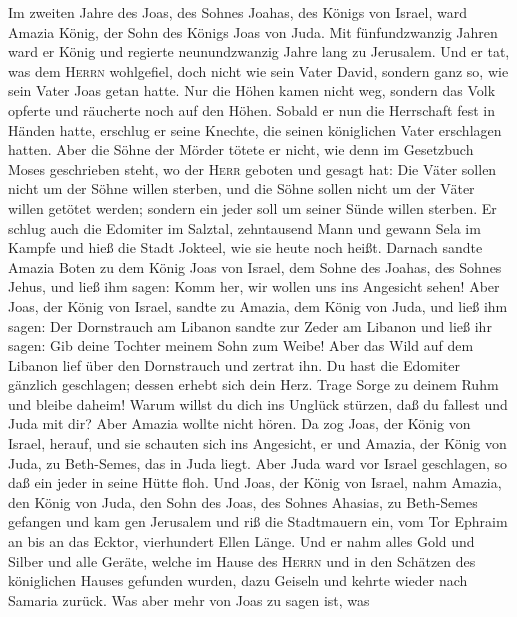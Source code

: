  Im zweiten Jahre des Joas, des Sohnes Joahas, des Königs
von Israel, ward Amazia König, der Sohn des Königs Joas von Juda.
 Mit fünfundzwanzig Jahren ward er König und regierte
neunundzwanzig Jahre lang zu Jerusalem.  Und er tat, was
dem \textsc{Herrn} wohlgefiel, doch nicht wie sein Vater David, sondern
ganz so, wie sein Vater Joas getan hatte.  Nur die Höhen
kamen nicht weg, sondern das Volk opferte und räucherte noch auf den
Höhen.  Sobald er nun die Herrschaft fest in Händen hatte,
erschlug er seine Knechte, die seinen königlichen Vater erschlagen
hatten.  Aber die Söhne der Mörder tötete er nicht, wie
denn im Gesetzbuch Moses geschrieben steht, wo der \textsc{Herr} geboten
und gesagt hat: Die Väter sollen nicht um der Söhne willen sterben, und
die Söhne sollen nicht um der Väter willen getötet werden; sondern ein
jeder soll um seiner Sünde willen sterben.  Er schlug auch
die Edomiter im Salztal, zehntausend Mann und gewann Sela im Kampfe und
hieß die Stadt Jokteel, wie sie heute noch heißt.  Darnach
sandte Amazia Boten zu dem König Joas von Israel, dem Sohne des Joahas,
des Sohnes Jehus, und ließ ihm sagen: Komm her, wir wollen uns ins
Angesicht sehen!  Aber Joas, der König von Israel, sandte
zu Amazia, dem König von Juda, und ließ ihm sagen: Der Dornstrauch am
Libanon sandte zur Zeder am Libanon und ließ ihr sagen: Gib deine
Tochter meinem Sohn zum Weibe! Aber das Wild auf dem Libanon lief über
den Dornstrauch und zertrat ihn.  Du hast die Edomiter
gänzlich geschlagen; dessen erhebt sich dein Herz. Trage Sorge zu deinem
Ruhm und bleibe daheim! Warum willst du dich ins Unglück stürzen, daß du
fallest und Juda mit dir?  Aber Amazia wollte nicht
hören. Da zog Joas, der König von Israel, herauf, und sie schauten sich
ins Angesicht, er und Amazia, der König von Juda, zu Beth-Semes, das in
Juda liegt.  Aber Juda ward vor Israel geschlagen, so daß
ein jeder in seine Hütte floh.  Und Joas, der König von
Israel, nahm Amazia, den König von Juda, den Sohn des Joas, des Sohnes
Ahasias, zu Beth-Semes gefangen und kam gen Jerusalem und riß die
Stadtmauern ein, vom Tor Ephraim an bis an das Ecktor, vierhundert Ellen
Länge.  Und er nahm alles Gold und Silber und alle
Geräte, welche im Hause des \textsc{Herrn} und in den Schätzen des
königlichen Hauses gefunden wurden, dazu Geiseln und kehrte wieder nach
Samaria zurück.  Was aber mehr von Joas zu sagen ist, was
